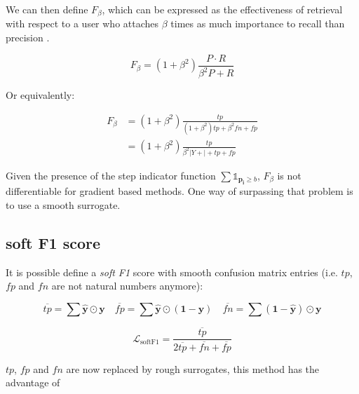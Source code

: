 We can then define \(F_\beta\), which can be expressed as the effectiveness of retrieval with respect to a user who attaches \(\beta\) times as much importance to recall than precision \cite{informationRetrieval}.


\begin{equation}
F_{\beta}=\left(1+\beta^{2}\right) \frac{P \cdot R}{\beta^{2} P+R}
\end{equation}

Or equivalently:

\begin{equation}
\begin{aligned} F_{\beta} &=\left(1+\beta^{2}\right) \frac{t p}{\left(1+\beta^{2}\right) t p+\beta^{2} f n+f p} \\ &=\left(1+\beta^{2}\right) \frac{t p}{\beta^{2}|Y+|+t p+f p} \end{aligned}
\end{equation}

Given the presence of the step indicator function \(\sum \mathds{1}_{\mathbf{p_i} \geq b}\), \(F_\beta\) is not differentiable for gradient based methods. One way of surpassing that problem is to use a smooth surrogate.

\subsection{soft F1 score}
\label{sec:org3ca83ef}

It is possible define a \emph{soft F1} score \cite{softF1}  with smooth confusion matrix entries (i.e. \(tp\), \(fp\) and \(fn\) are not natural numbers anymore):

$$
\overline{tp}=\sum \hat{\mathbf{y}} \odot \mathbf{y} \quad \overline{fp} = \sum \hat{\mathbf{y}} \odot (\mathbf{1}- \mathbf{y}) \quad \overline{fn} = \sum (\mathbf{1} - \hat{\mathbf{y}}) \odot \mathbf{y}
$$

\begin{equation}
\mathcal{L}_{\text {softF1}}= \frac{\overline{tp}}{2 \overline{tp}+ \overline{fn}+ \overline{fp}}
\end{equation}

\(tp\), \(fp\) and \(fn\) are now replaced by rough surrogates, this method has the advantage of 


